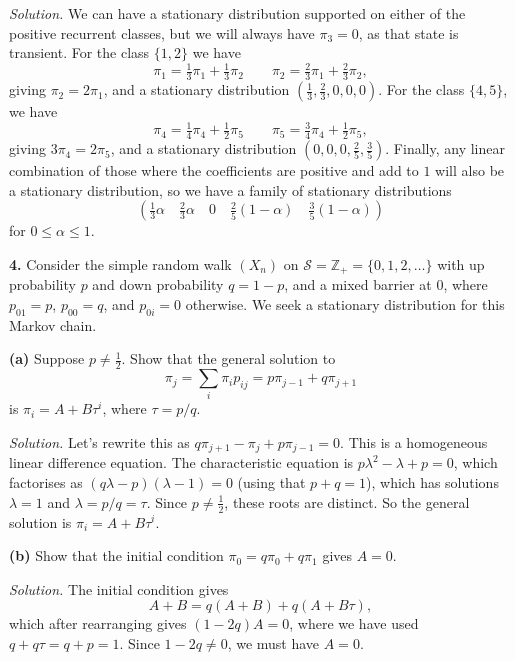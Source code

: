 \documentclass[
  a4paper,
]{article}
\theoremstyle{definition}
\theoremstyle{definition}
\theoremstyle{definition}
\theoremstyle{remark}
\begin{document}
\begin{myanswers}

\emph{Solution.} We can have a stationary distribution supported on either of the positive recurrent classes, but we will always have \(\pi_3 = 0\), as that state is transient. For the class \(\{1,2\}\) we have
\[ \pi_1 = \tfrac13\pi_1 + \tfrac13\pi_2 \qquad \pi_2 = \tfrac23\pi_1 + \tfrac23\pi_2 , \]
giving \(\pi_2 = 2\pi_1\), and a stationary distribution \((\tfrac 13, \tfrac23, 0, 0, 0)\). For the class \(\{4,5\}\), we have
\[ \pi_4 = \tfrac14\pi_4 + \tfrac12\pi_5 \qquad \pi_5 = \tfrac34\pi_4 + \tfrac12\pi_5 , \]
giving \(3\pi_4 = 2\pi_5\), and a stationary distribution \((0,0,0,\frac25,\frac35)\). Finally, any linear combination of those where the coefficients are positive and add to \(1\) will also be a stationary distribution, so we have a family of stationary distributions
\[ \left( \tfrac13\alpha \quad \tfrac23\alpha \quad 0 \quad \tfrac25(1-\alpha) \quad \tfrac35(1-\alpha) \right)    \]
for \(0 \leq \alpha \leq 1\).

\end{myanswers}

\textbf{4.} Consider the simple random walk \((X_n)\) on \(\mathcal S = \mathbb Z_+ = \{0,1,2,\dots\}\) with up probability \(p\) and down probability \(q = 1-p\), and a mixed barrier at \(0\), where \(p_{01} = p\), \(p_{00} = q\), and \(p_{0i} = 0\) otherwise. We seek a stationary distribution for this Markov chain.

\textbf{(a)} Suppose \(p \neq \frac12\). Show that the general solution to
\[ \pi_j = \sum_i \pi_i p_{ij} = p\pi_{j-1} + q\pi_{j+1} \]
is \(\pi_i = A + B\tau^i\), where \(\tau = p/q\).

\begin{myanswers}

\emph{Solution.} Let's rewrite this as \(q\pi_{j+1} - \pi_j + p\pi_{j-1} = 0\). This is a homogeneous linear difference equation. The characteristic equation is \(p\lambda^2 - \lambda + p = 0\), which factorises as \((q\lambda - p)(\lambda-1) = 0\) (using that \(p + q = 1\)), which has solutions \(\lambda = 1\) and \(\lambda = p/q = \tau\). Since \(p \neq \frac12\), these roots are distinct. So the general solution is \(\pi_i = A + B\tau^i\).

\end{myanswers}

\textbf{(b)} Show that the initial condition \(\pi_0 = q\pi_0 + q\pi_1\) gives \(A = 0\).

\begin{myanswers}

\emph{Solution.} The initial condition gives
\[ A + B = q(A + B) + q(A + B\tau)  ,\]
which after rearranging gives \((1-2q)A = 0\), where we have used \(q + q\tau = q + p = 1\). Since \(1-2q\neq 0\), we must have \(A = 0\).

\end{myanswers}
\end{document}
